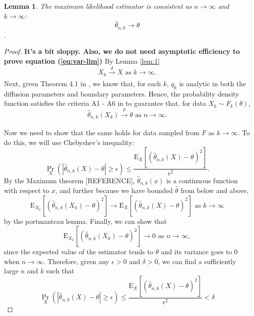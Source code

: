 \documentclass[10pt]{article}
\newtheorem{lemma}{Lemma}
\begin{document}
\begin{lemma}
  The maximum likelihood estimator is consistent as $n \to \infty$ and $k \to \infty$:
  \[ \hat{\theta}_{n,k} \to \theta \].
\end{lemma}
\begin{proof}
  \textbf{\color{red} It's a bit sloppy. Also, we do not need
    asymptotic efficiency to prove equation (\ref{eq:var-lim})} By
  Lemma \ref{lem:1}
    \[ X_k \xrightarrow[]{d} X \mbox { as } k \to \infty. \] Next,
    given Theorem 4.1 in \cite{singler2008differentiability}, we know
    that, for each $k$, $q_k$ is analytic in both the diffusion
    parameters and boundary parameters. Hence, the probability density
    function satisfies the criteria A1 - A6 in
    \cite{casella2002statistical} to guarantee that, for data
    $X_{k} \sim F_k(\theta)$,
    \[ \hat{\theta}_{n,k}(X_k) \xrightarrow[]{p} \theta \mbox{ as } n
      \to \infty. \]

    Now we need to show that the same holds for data sampled from $F$
    as $k \to \infty$. To do this, we will use Chebyshev's inequality:
  \[
    \Pr_{X}\left( \left| \hat{\theta}_{n,k}(X) - \theta \right| \geq
      \epsilon \right) \leq \frac{ \mbox{E}_{X}\left[
        (\hat{\theta}_{n,k}(X) - \theta)^2 \right] }{ \epsilon^2 }.
  \]
  By the Maximum theorem [REFERENCE], $\hat{\theta}_{n,k}(x)$ is a continuous
  function with respect to $x$, and further because we have bounded
  $\hat{\theta}$ from below and above,
  \[
    \mbox{E}_{X_k}\left[ (\hat{\theta}_{n,k}(X_k) - \theta)^2 \right]
    \to \mbox{E}_{X}\left[ (\hat{\theta}_{n,k}(X) - \theta)^2 \right]
    \mbox{ as } k \to \infty
  \]
  by the portmanteau lemma. Finally, we can show that
  \begin{equation}
    \mbox{E}_{X_k}\left[ (\hat{\theta}_{n,k}(X_k) - \theta)^2 \right]
    \to 0 \mbox{ as } n \to \infty, \label{eq:var-lim}
  \end{equation}
  since the expected value of the estimator tends to $\theta$ and its
  variance goes to 0 when $n \to \infty$. Therefore, given any
  $\epsilon > 0$ and $\delta > 0$, we can find a sufficiently large
  $n$ and $k$ such that
  \[
    \Pr_{X}\left( \left| \hat{\theta}_{n,k}(X) - \theta \right| \geq
      \epsilon \right) \leq \frac{ \mbox{E}_{X}\left[
        (\hat{\theta}_{n,k}(X) - \theta)^2 \right] }{ \epsilon^2 } < \delta    
  \]
\end{proof}




\end{document}
